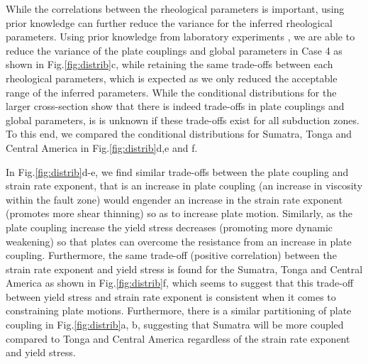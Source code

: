 \documentclass[12pt]{article}
\begin{document}
While the correlations between the rheological parameters is important, using prior knowledge can further reduce the variance for the inferred rheological parameters. Using prior knowledge from laboratory experiments \citep{korenaga2008new}, we are able to reduce the variance of the plate couplings and global parameters in Case 4 as shown in Fig.\ref{fig:distrib}c, while retaining the same trade-offs between each rheological parameters, which is expected as we only reduced the acceptable range of the inferred parameters. While the conditional distributions for the larger cross-section show that there is indeed trade-offs in plate couplings and global parameters, is is unknown if these trade-offs exist for all subduction zones. To this end, we compared the conditional distributions for Sumatra, Tonga and Central America in Fig.\ref{fig:distrib}d,e and f. 

In Fig.\ref{fig:distrib}d-e, we find similar trade-offs between the plate coupling and strain rate exponent, that is an increase in plate coupling (an increase in viscosity within the fault zone) would engender an increase in the strain rate exponent (promotes more shear thinning) so as to increase plate motion. Similarly, as the plate coupling increase the yield stress decreases (promoting more dynamic weakening) so that plates can overcome the resistance from an increase in plate coupling. Furthermore, the same trade-off (positive correlation) between the strain rate exponent and yield stress is found for the Sumatra, Tonga and Central America as shown in Fig.\ref{fig:distrib}f, which seems to suggest that this trade-off between yield stress and strain rate exponent is consistent when it comes to constraining plate motions. Furthermore, there is a similar partitioning of plate coupling in Fig.\ref{fig:distrib}a, b, suggesting that Sumatra will be more coupled compared to Tonga and Central America regardless of the strain rate exponent and yield stress.
\end{document}
